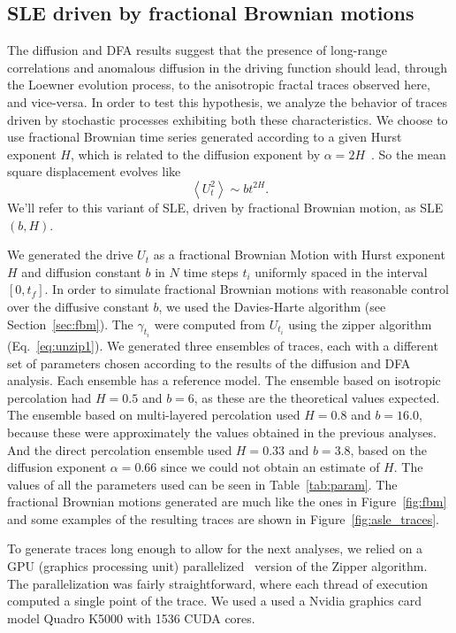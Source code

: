 \subsection{SLE driven by fractional Brownian motions}
\label{sec:slebh}

The diffusion and DFA results suggest that the presence of long-range
correlations and anomalous diffusion in the driving function should lead,
through the Loewner evolution process, to the anisotropic fractal traces
observed here, and vice-versa. In order to test this hypothesis, we analyze the
behavior of traces driven by stochastic processes exhibiting both these
characteristics. We choose to use fractional Brownian time series generated
according to a given Hurst exponent $H$, which is related to the diffusion
exponent by $\alpha=2H$~\cite{Mandelbrot1968}. So the mean square displacement
evolves like
\begin{equation}
    \left\langle U_{t}^{2}\right\rangle \sim bt^{2H}.
\end{equation}
We'll refer to this variant of SLE, driven by fractional Brownian motion, as
SLE$(b,H)$.

We generated the drive $U_t$ as a fractional Brownian Motion with Hurst
exponent $H$ and diffusion constant $b$ in $N$ time steps $t_i$ uniformly
spaced in the interval $[0, t_f]$. In order to simulate fractional Brownian
motions with reasonable control over the diffusive constant $b$, we used the
Davies-Harte algorithm (see Section~\ref{sec:fbm}). The $\gamma_{t_i}$ were
computed from $U_{t_i}$ using the zipper algorithm (Eq.~\ref{eq:unzip1}). We
generated three ensembles of traces, each with a different set of parameters
chosen according to the results of the diffusion and DFA analysis. Each
ensemble has a reference model. The ensemble based on isotropic percolation had
$H=0.5$ and $b=6$, as these are the theoretical values expected. The ensemble
based on multi-layered percolation used $H=0.8$ and $b=16.0$, because these
were approximately the values obtained in the previous analyses. And the direct
percolation ensemble used $H=0.33$ and $b=3.8$, based on the diffusion exponent
$\alpha=0.66$ since we could not obtain an estimate of $H$. The values of all
the parameters used can be seen in Table~\ref{tab:param}. The fractional
Brownian motions generated are much like the ones in Figure~\ref{fig:fbm} and
some examples of the resulting traces are shown in
Figure~\ref{fig:asle_traces}.

To generate traces long enough to allow for the next analyses, we relied on a
GPU (graphics processing unit) parallelized~\cite{Che2008} version of the
Zipper algorithm. The parallelization was fairly straightforward, where each
thread of execution computed a single point of the trace. We used a used a
Nvidia graphics card model Quadro K5000 with 1536 CUDA cores.


